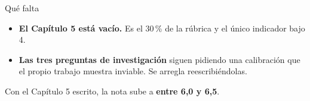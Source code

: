 \documentclass[aspectratio=169]{beamer}
\begin{document}
\begin{frame}{Qué falta}

\begin{itemize}
  \item \textbf{El Capítulo 5 está vacío.} Es el 30\,\% de la rúbrica y el único indicador bajo 4.
  \item \textbf{Las tres preguntas de investigación} siguen pidiendo una calibración que el propio trabajo muestra inviable. Se arregla reescribiéndolas.
\end{itemize}

\vfill
\begin{block}{}
\centering
Con el Capítulo 5 escrito, la nota sube a \textbf{entre 6,0 y 6,5}.
\end{block}

\end{frame}
\end{document}
